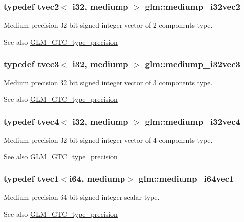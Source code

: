 \subsubsection[{mediump\+\_\+i32vec2}]{\setlength{\rightskip}{0pt plus 5cm}typedef tvec2$<$ {\bf i32}, mediump $>$ {\bf glm\+::mediump\+\_\+i32vec2}}\label{namespaceglm_a7340c2a0bb4cef81a39af043b5604054}
Medium precision 32 bit signed integer vector of 2 components type. \begin{DoxySeeAlso}{See also}
\hyperlink{group__gtc__type__precision}{G\+L\+M\+\_\+\+G\+T\+C\+\_\+type\+\_\+precision} 
\end{DoxySeeAlso}
\hypertarget{namespaceglm_a67adf4d9792c7c62838f62ad1116f80b}{}
\subsubsection[{mediump\+\_\+i32vec3}]{\setlength{\rightskip}{0pt plus 5cm}typedef tvec3$<$ {\bf i32}, mediump $>$ {\bf glm\+::mediump\+\_\+i32vec3}}\label{namespaceglm_a67adf4d9792c7c62838f62ad1116f80b}
Medium precision 32 bit signed integer vector of 3 components type. \begin{DoxySeeAlso}{See also}
\hyperlink{group__gtc__type__precision}{G\+L\+M\+\_\+\+G\+T\+C\+\_\+type\+\_\+precision} 
\end{DoxySeeAlso}
\hypertarget{namespaceglm_a574b78e832855a2326c874aec67b05dd}{}
\subsubsection[{mediump\+\_\+i32vec4}]{\setlength{\rightskip}{0pt plus 5cm}typedef tvec4$<$ {\bf i32}, mediump $>$ {\bf glm\+::mediump\+\_\+i32vec4}}\label{namespaceglm_a574b78e832855a2326c874aec67b05dd}
Medium precision 32 bit signed integer vector of 4 components type. \begin{DoxySeeAlso}{See also}
\hyperlink{group__gtc__type__precision}{G\+L\+M\+\_\+\+G\+T\+C\+\_\+type\+\_\+precision} 
\end{DoxySeeAlso}
\hypertarget{namespaceglm_aeca4a58c98c54100e8aa8c57ff05b149}{}
\subsubsection[{mediump\+\_\+i64vec1}]{\setlength{\rightskip}{0pt plus 5cm}typedef tvec1$<${\bf i64}, mediump$>$ {\bf glm\+::mediump\+\_\+i64vec1}}\label{namespaceglm_aeca4a58c98c54100e8aa8c57ff05b149}
Medium precision 64 bit signed integer scalar type. \begin{DoxySeeAlso}{See also}
\hyperlink{group__gtc__type__precision}{G\+L\+M\+\_\+\+G\+T\+C\+\_\+type\+\_\+precision} 
\end{DoxySeeAlso}
\hypertarget{namespaceglm_ac9b4b83ee34df1f21f6dbfc5746e8177}{}
